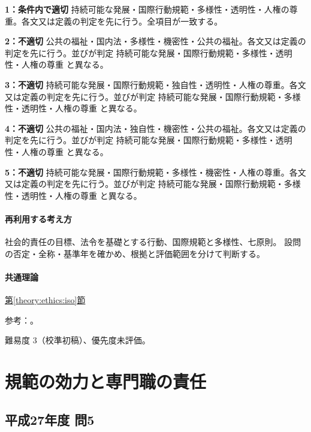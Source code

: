 \noindent\textbf{1：条件内で適切} 持続可能な発展・国際行動規範・多様性・透明性・人権の尊重。各文又は定義の判定を先に行う。全項目が一致する。\par

\noindent\textbf{2：不適切} 公共の福祉・国内法・多様性・機密性・公共の福祉。各文又は定義の判定を先に行う。並びが判定 持続可能な発展・国際行動規範・多様性・透明性・人権の尊重 と異なる。\par

\noindent\textbf{3：不適切} 持続可能な発展・国際行動規範・独自性・透明性・人権の尊重。各文又は定義の判定を先に行う。並びが判定 持続可能な発展・国際行動規範・多様性・透明性・人権の尊重 と異なる。\par

\noindent\textbf{4：不適切} 公共の福祉・国内法・独自性・機密性・公共の福祉。各文又は定義の判定を先に行う。並びが判定 持続可能な発展・国際行動規範・多様性・透明性・人権の尊重 と異なる。\par

\noindent\textbf{5：不適切} 持続可能な発展・国際行動規範・多様性・機密性・人権の尊重。各文又は定義の判定を先に行う。並びが判定 持続可能な発展・国際行動規範・多様性・透明性・人権の尊重 と異なる。\par

\paragraph{再利用する考え方} 社会的責任の目標、法令を基礎とする行動、国際規範と多様性、七原則。 設問の否定・全称・基準年を確かめ、根拠と評価範囲を分けて判断する。

\paragraph{共通理論} \hyperref[theory:ethics:iso]{第\ref*{theory:ethics:iso}節}

\par 参考：\cite{iso26000,eth54_iso_brochure}。

\par 難易度 3（校準初稿）、優先度未評価。

\section{規範の効力と専門職の責任}

\subsection{平成27年度 問5}
\label{q:h27-reg-apt-05}

